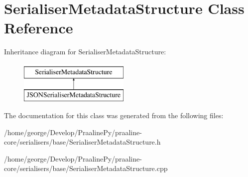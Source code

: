 \hypertarget{class_serialiser_metadata_structure}{}\section{Serialiser\+Metadata\+Structure Class Reference}
\label{class_serialiser_metadata_structure}
Inheritance diagram for Serialiser\+Metadata\+Structure\+:\begin{figure}[H]
\begin{center}
\leavevmode
\includegraphics[height=2.000000cm]{class_serialiser_metadata_structure}
\end{center}
\end{figure}


The documentation for this class was generated from the following files\+:\begin{DoxyCompactItemize}
\item 
/home/george/\+Develop/\+Praaline\+Py/praaline-\/core/serialisers/base/Serialiser\+Metadata\+Structure.\+h\item 
/home/george/\+Develop/\+Praaline\+Py/praaline-\/core/serialisers/base/Serialiser\+Metadata\+Structure.\+cpp\end{DoxyCompactItemize}
